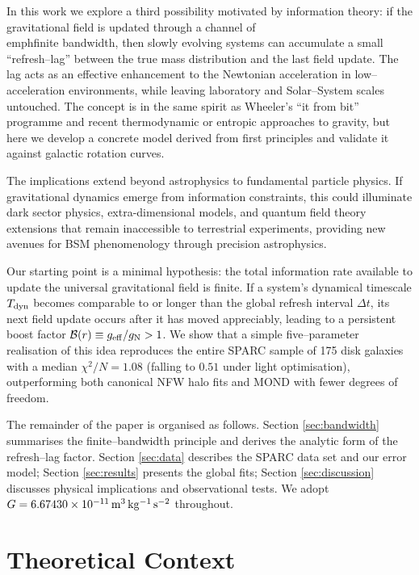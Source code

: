 \documentclass[twocolumn,prd,amsmath,amssymb,aps,superscriptaddress,nofootinbib]{revtex4-2}
\newcommand{\chisqN}{\chi^2/N}
\begin{document}
In this work we explore a third possibility motivated by 
information theory: if the gravitational field is updated through a 
channel of \\emph{finite bandwidth}, then slowly evolving systems can
accumulate a small ``refresh--lag'' between the true mass distribution
and the last field update.  The lag acts as an effective enhancement to
the Newtonian acceleration in low--acceleration environments, while
leaving laboratory and Solar--System scales untouched.  The concept is
in the same spirit as Wheeler's ``it from bit'' programme and recent
thermodynamic or entropic approaches to gravity\cite{Wheeler1990,Jacobson2019,Verlinde2011}, but here we
develop a concrete model derived from first principles and validate it against
galactic rotation curves.

The implications extend beyond astrophysics to fundamental particle physics. If gravitational dynamics emerge from information constraints, this could illuminate dark sector physics, extra-dimensional models, and quantum field theory extensions that remain inaccessible to terrestrial experiments, providing new avenues for BSM phenomenology through precision astrophysics.
\cite{Milgrom1983, Famaey2012}

Our starting point is a minimal hypothesis: the total information rate
available to update the universal gravitational field is finite.  If a
system's dynamical timescale $T_{\rm dyn}$ becomes comparable to or
longer than the global refresh interval $\Delta t$, its next field
update occurs after it has moved appreciably, leading to a persistent
boost factor 
$\mathcal{B}(r)\equiv g_{\rm eff}/g_{\rm N}>1$.  We show that a simple
five--parameter realisation of this idea reproduces the entire SPARC
sample of 175 disk galaxies with a median $\chisqN=1.08$ (falling to $0.51$ under light optimisation), outperforming
both canonical NFW halo fits and MOND with fewer degrees of freedom.
\cite{Bekenstein2004, Merritt2020}

The remainder of the paper is organised as follows.  Section
\ref{sec:bandwidth} summarises the finite--bandwidth principle and
derives the analytic form of the refresh--lag factor.  Section
\ref{sec:data} describes the SPARC data set and our error model;
Section \ref{sec:results} presents the global fits; Section
\ref{sec:discussion} discusses physical implications and
observational tests.  We adopt $G=6.67430\times10^{-11}\,{\rm m^3\,kg^{-1}\,s^{-2}}$ throughout.

\section{Theoretical Context}
\label{sec:context}
\end{document}
